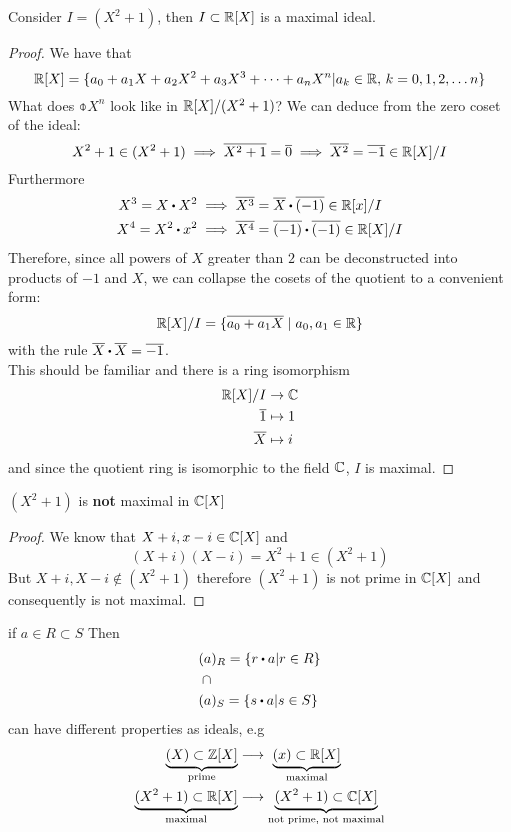 \documentclass[../Main.tex]{subfiles}
\begin{document}
\begin{claim}
Consider $I=(X^2+1)$, then $I\subset \mathbb{R}[X]$ is a maximal ideal.
\end{claim}
\begin{proof}
	We have that
	\[\mathbb{R}[X] = \{a_0+a_1X+a_2X^2+a_3X^3+\dots+a_nX^n| a_k\in \mathbb{R}, \, k=0,1,2,\dots n\}\]
	What does $\obar{X^n}$ look like in $\mathbb{R}[X]/(X^2+1)$?
	We can deduce from the zero coset of the ideal:
		\[X^2+1 \in (X^2+1) \implies \overline{X^2+1} = \overline{0} \implies \overline{X^2} = \overline{-1} \in \mathbb{R}[X]/I \]
	Furthermore
		\begin{align*}
		X^3 = X\rdot X^2 &\implies \obar{X^3} = \obar{X} \rdot \obar{(-1)} \in \R[x]/I\\
		X^4= X^2\rdot x^2 &\implies \obar{X^4} = \obar{(-1)} \rdot  \obar{(-1)} \in \R[X]/I
	\end{align*}
	Therefore, since all powers of $X$ greater than $2$ can be deconstructed into products of $-1$ and $X$, we can collapse the cosets of the quotient to a convenient form:
	\[\mathbb{R}[X]/I = \{\overline{a_0+a_1X}\mid a_0,a_1\in \mathbb{R}\} \]
	with the rule $\obar{X}\rdot \obar{X}=\obar{-1}$.\\
	This should be familiar and there is a ring isomorphism
	\begin{align*}
	\mathbb{R}[X]/I &\to \mathbb{C} \\
	\overline{1} &\mapsto 1 \\
	\overline{X} &\mapsto i
	\end{align*}
	and since the quotient ring is isomorphic to the field $\mathbb{C}$, $I$ is maximal.
\end{proof}
\begin{claim}
	$(X^2+1)$ is \textbf{not} maximal in $\mathbb{C}[X]$
\end{claim}
\begin{proof}
	We know that $X+i,x-i \in \mathbb{C}[X]$ and
	\[(X+i)(X-i)=X^2+1\in (X^2+1)\]
	But $X+i,X-i \notin (X^2+1)$ therefore $(X^2+1)$ is not prime in $\mathbb{C}[X]$ and consequently is not maximal.
\end{proof}
\Obs if $a\in R\subset S$ Then
\begin{align*}
(a&)_R = \{r\rdot a | r\in R\}\\
\cap&\\
(a&)_S=\{s\rdot a|s\in S\}
\end{align*}
can have different properties as ideals, e.g
\begin{align*}
\underbrace{(X)\subset \mathbb{Z}[X]}_{\text{prime}} &\longrightarrow \,\,\underbrace{(x) \subset \mathbb{R}[X]}_{\text{maximal}}
\\
\underbrace{(X^2+1)\subset \mathbb{R}[X]}_{\text{maximal}} &\longrightarrow \underbrace{(X^2+1) \subset \mathbb{C}[X]}_{\text{not prime, not maximal}}
\end{align*}\newpage
\end{document}
